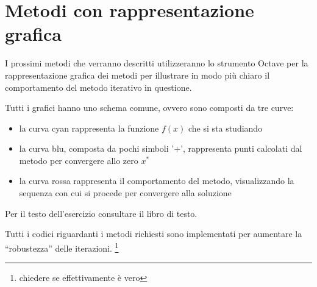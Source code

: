 \section*{Metodi con rappresentazione grafica}
I prossimi metodi che verranno descritti utilizzeranno lo strumento Octave
per la rappresentazione grafica dei metodi per illustrare in modo pi\`u chiaro
il comportamento del metodo iterativo in questione.

Tutti i grafici hanno uno schema comune, ovvero sono composti da tre curve:
\begin{itemize}
  \item la curva cyan rappresenta la funzione $f(x)$ che si sta studiando
  \item la curva blu, composta da pochi simboli '$+$', rappresenta punti
  calcolati dal metodo per convergere allo zero $x^{*}$
  \item la curva rossa rappresenta il comportamento del metodo, visualizzando
  la sequenza con cui si procede per convergere alla soluzione
\end{itemize}





\begin{exercise}[2.9]
Per il testo dell'esercizio consultare il libro di testo.
\end{exercise}
Tutti i codici riguardanti i metodi richiesti sono implementati per aumentare
la ``robustezza'' delle iterazioni. \footnote{chiedere se effettivamente \`e
vero}
